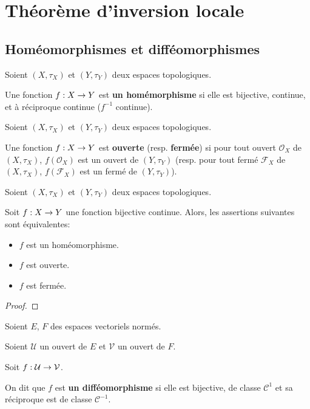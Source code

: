 \chapter{Théorème d'inversion locale}

\section{Homéomorphismes et difféomorphismes}

\begin{definition}
	\label{definition:homeomorphisme}
	Soient $(X, \tau_{X})$ et $(Y, \tau_{Y})$ deux espaces topologiques.

	Une fonction $f : X \rightarrow Y$ est \textbf{un homémorphisme} si elle
	est bijective, continue, et à réciproque continue ($f^{-1}$ continue).
\end{definition}


\begin{definition}
	Soient $(X, \tau_{X})$ et $(Y, \tau_{Y})$ deux espaces topologiques.

	Une fonction $f : X \rightarrow Y$ est \textbf{ouverte} (resp.
	\textbf{fermée}) si pour tout ouvert $\mathcal{O}_{X}$ de $(X, \tau_{X})$,
	$f(\mathcal{O}_{X})$ est un ouvert de $(Y, \tau_{Y})$ (resp. pour tout fermé
	$\mathcal{F}_{X}$ de $(X, \tau_{X})$, $f(\mathcal{F}_{X})$ est un fermé de
	$(Y, \tau_{Y})$).
\end{definition}

\begin{theorem}
	Soient $(X, \tau_{X})$ et $(Y, \tau_{Y})$ deux espaces topologiques.

	Soit $f : X \rightarrow Y$ une fonction bijective continue. Alors, les
	assertions suivantes sont équivalentes:

	\begin{itemize}
		\item $f$ est un homéomorphisme.
		\item $f$ est ouverte.
		\item $f$ est fermée.
	\end{itemize}
\end{theorem}

\ifdefined\outputproof
\begin{proof}

\end{proof}
\fi

\begin{definition}
	\label{definition:diffeomorphism}
	Soient $E$, $F$ des espaces vectoriels normés.

	Soient $\mathcal{U}$ un ouvert de $E$ et $\mathcal{V}$ un ouvert de $F$.

	Soit $f : \mathcal{U} \rightarrow \mathcal{V}$.

	On dit que $f$ est \textbf{un difféomorphisme} si elle est bijective,
	de classe $\mathcal{C}^{1}$ et sa réciproque est de classe
	$\mathcal{C}^{-1}$.
\end{definition}

